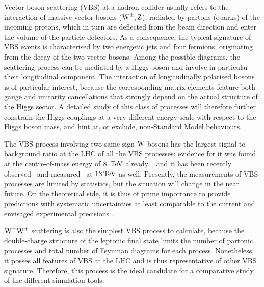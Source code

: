 Vector-boson scattering (VBS) at a hadron collider 
usually refers to the interaction of massive vector-bosons ($\text{W}^\pm,\text{Z}$),
radiated by partons (quarks) of the incoming protons, 
which in turn are deflected from the beam direction 
and enter the volume of the particle detectors.
As a consequence, the typical signature of VBS events
is characterised by two energetic jets 
and four fermions,
originating from the decay of the two vector bosons.
Among the possible diagrams,
the scattering process can be mediated by a Higgs boson
and involve in particular their longitudinal component.
The interaction of longitudinally polarised bosons is of particular interest, 
because the corresponding matrix elements feature both gauge and unitarity cancellations 
that strongly depend on the actual structure of the Higgs sector.
A detailed study of this class of processes will therefore further constrain the Higgs couplings 
at a very different energy scale with respect to the Higgs boson mass,
and hint at, or exclude, non-Standard Model behaviours.

The VBS process involving two same-sign $\text{W}$ bosons has the largest signal-to-background ratio at the LHC of all the VBS processes:
evidence for it was found at the centre-of-mass energy of $8~\,\text{TeV}$ already~\cite{Aad:2014zda,Khachatryan:2014sta},
and it has been recently observed~\cite{Sirunyan:2017ret} and measured~\cite{Aaboud:2016ffv} 
at $13\,\text{TeV}$ as well.
Presently, the measurements of VBS processes are limited by statistics, but the situation will change in the near future.
On the theoretical side, 
it is thus of prime importance to provide predictions with systematic uncertainties
at least comparable to the current and envisaged experimental precisions~\cite{CMS:2016rcn}.


$\text{W}^+\text{W}^+$ scattering is also the simplest VBS process to calculate, 
because the double-charge structure of the leptonic final state 
limits the number of partonic processes and total number of Feynman diagrams for each process.
Nonetheless, it posses all features of VBS at the LHC and is thus representative of other VBS signature.
Therefore, this process is the ideal candidate for a comparative study of the different simulation tools.

